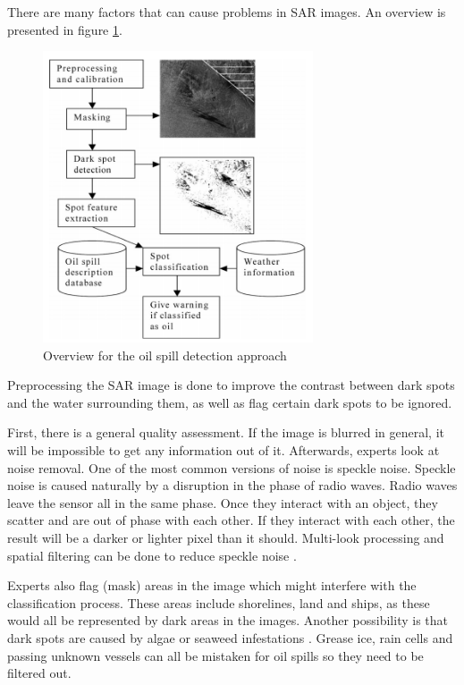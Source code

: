 There are many factors that can cause problems in SAR images. An overview is presented in figure \ref{fig:overview}.
\begin{figure}[H]
    \includegraphics[width=80mm]{./img/detection_diagram.png}
    \caption{Overview for the oil spill detection approach \cite{Solberg200745}}
    \label{fig:overview}
\end{figure}
Preprocessing the SAR image is done to improve the contrast between dark spots and the water surrounding them, as well as flag certain dark spots to be ignored. 

First, there is a general quality assessment. If the image is blurred in general, it will be impossible to get any information out of it. Afterwards, experts look at noise removal. One of the most common versions of noise is speckle noise. Speckle noise is caused naturally by a disruption in the phase of radio waves. Radio waves leave the sensor all in the same phase. Once they interact with an object, they scatter and are out of phase with each other. If they interact with each other, the result will be a darker or lighter pixel than it should. Multi-look processing and spatial filtering can be done to reduce speckle noise \cite{simard1998analysis}.

Experts also flag (mask) areas in the image which might interfere with the classification process. These areas include shorelines, land and ships, as these would all be represented by dark areas in the images.
Another possibility is that dark spots are caused by algae or seaweed infestations \cite{fingas2014review}. Grease ice, rain cells and passing unknown vessels can all be mistaken for oil spills \cite{Brekke200595} so they need to be filtered out. 

